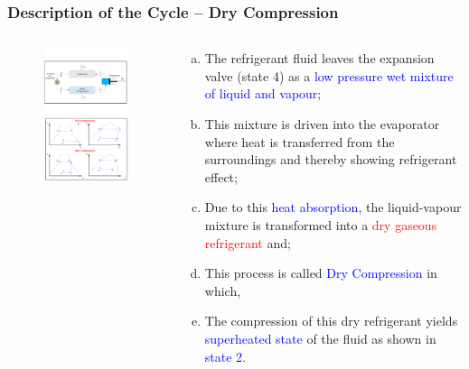 \documentclass[10pt,compress]{beamer}
\begin{document}
\begin{frame}
 \frametitle{Description of the Cycle -- Dry Compression}
  \begin{columns}
   \begin{column}[c]{0.5\linewidth}
    \begin{figure}%
     \vbox{
      \includegraphics[width=5.5cm,clip]{./Pics/Overview_Refrig12}
      \vspace{-.5cm}
      \includegraphics[width=4.5cm,clip]{./Pics/Overview_Refrig13}}
    \end{figure}  
   \end{column}  
   \begin{column}[c]{0.5\linewidth}
  \begin{enumerate}[(a)]
   \item <1-> The refrigerant fluid leaves the expansion valve (state 4) as a \textcolor{blue}{low pressure wet mixture of liquid and vapour};
   \item <2-> This mixture is driven into the evaporator where heat is transferred from the surroundings and thereby showing refrigerant effect; 
   \item <3-> Due to this \textcolor{blue}{heat absorption}, the liquid-vapour mixture is transformed into a \textcolor{red}{dry gaseous refrigerant} and;
   \item <4-> This process is called \textcolor{blue}{Dry Compression} in which,
   \item <5-> The compression of this dry refrigerant yields \textcolor{blue}{superheated state} of the fluid as shown in \textcolor{blue}{state 2}.
  \end{enumerate}
 \end{column}  
\end{columns}
\end{frame}
\end{document}
